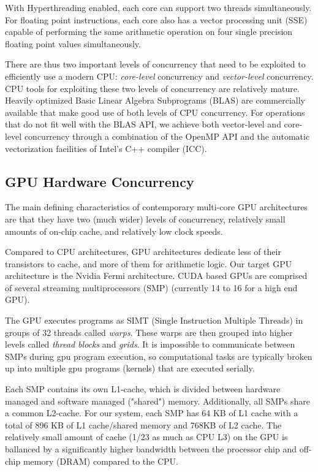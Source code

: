 \documentclass[10pt,twocolumn,letterpaper]{article}
\begin{document}
With Hyperthreading enabled, each core can support two threads simultaneously.
For floating point instructions, each core also has a vector processing unit
(SSE) capable of performing the same arithmetic operation on four single
precision floating point values simultaneously.  

There are thus two important levels of concurrency that need to be exploited to
efficiently use a modern CPU: {\em core-level} concurrency and {\em vector-level}
concurrency. CPU tools for exploiting these two levels of concurrency are
relatively mature.  Heavily optimized Basic Linear Algebra Subprograms (BLAS) are
commercially available that make good use of both levels of CPU concurrency.
For operations that do not fit well with the BLAS API, we 
achieve both vector-level and core-level concurrency through a combination of
the OpenMP API \cite{dagum2002openmp} and the automatic vectorization 
facilities of Intel's C++ compiler (ICC)\cite{dulong1999overview}.
\subsection{GPU Hardware Concurrency}
The main defining characteristics of contemporary multi-core GPU architectures
are that they have two (much wider) levels of concurrency, relatively small amounts of
on-chip cache, and relatively low clock speeds.  

Compared to CPU architectures, GPU architectures dedicate less of their transistors
to cache, and more of them for arithmetic logic. Our target GPU architecture
is the Nvidia Fermi architecture.  CUDA based GPUs are comprised of several 
streaming multiprocessors (SMP) (currently 14 to 16 for a high end GPU).

The GPU executes programs as SIMT (Single Instruction Multiple Threads) in
groups of 32 threads called \emph{warps}.  These warps are then grouped into
higher levels called \emph{thread blocks} and \emph{grids}.  It is impossible
to communicate between SMPs during gpu program execution, so computational tasks
are typically broken up into multiple gpu programs (kernels) that are executed
serially.  

Each SMP contains its own L1-cache, which is divided between hardware managed
and software managed ("shared") memory.  Additionally, all SMPs share a common
L2-cache.  For our system, each SMP has 64 KB of L1 cache with a total of 896
KB of L1 cache/shared memory and 768KB of L2 cache. The relatively small amount
of cache (1/23 as much as CPU L3) on the GPU is ballanced by a significantly
higher bandwidth between the processor chip and off-chip memory (DRAM) compared
to the CPU.  
\end{document}
